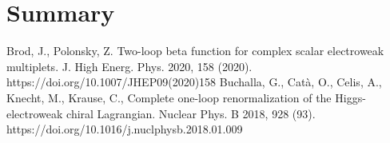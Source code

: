 \documentclass[11pt, a4paper]{article}
\begin{document}
\section*{Summary}

\begin{thebibliography}{9}
    Brod, J., Polonsky, Z. Two-loop beta function for complex scalar electroweak multiplets. J. High Energ. Phys. 2020, 158 (2020). https://doi.org/10.1007/JHEP09(2020)158
    Buchalla, G., Catà, O., Celis, A., Knecht, M., Krause, C., Complete one-loop renormalization of the Higgs-electroweak chiral Lagrangian. Nuclear Phys. B 2018, 928 (93). https://doi.org/10.1016/j.nuclphysb.2018.01.009
\end{thebibliography}
\end{document}
